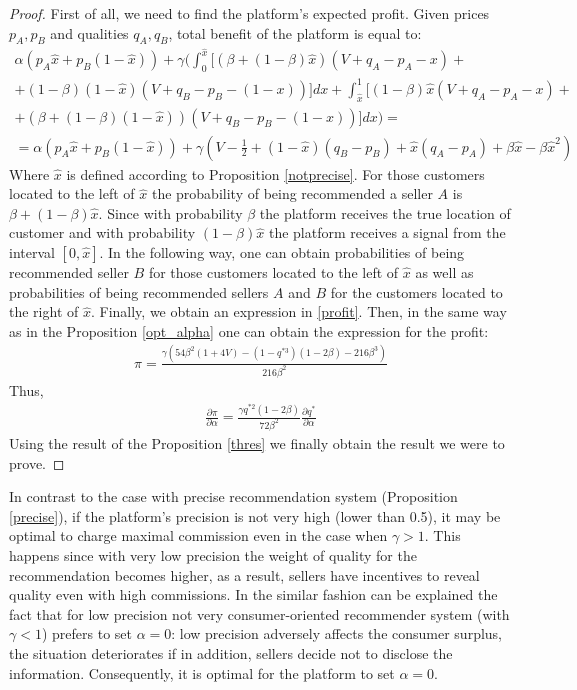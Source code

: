\documentclass[a4paper]{article}
\begin{document}
\begin{proof}
 First of all, we need to find the platform's expected profit. Given prices $p_A, p_B$ and qualities $q_A, q_B$, total benefit of the platform is equal to:
 \begin{align}\label{profit}
 \alpha(p_A \hat{x} + p_B(1-\hat{x})) + \gamma \biggl(\int_{0}^{\hat{x}} \biggl[ (\beta +(1-\beta)\hat{x})(V + q_A - p_A - x) + \nonumber \\+ (1-\beta)(1-\hat{x})(V + q_B - p_B - (1-x))\biggr]dx + \int_{\hat{x}}^1 \biggl[(1-\beta) \hat{x}(V+q_A-p_A-x) + \nonumber\\
 +(\beta + (1-\beta)(1-\hat{x}))(V + q_B - p_B -(1-x)) \biggr] dx\biggr) = \\
 = 	\alpha(p_A \hat{x} + p_B(1-\hat{x})) + \gamma \left(V - \frac{1}{2}+(1-\hat{x})(q_B - p_B) + \hat{x}(q_A-p_A) + \beta \hat{x} - \beta \hat{x}^2  \right)\nonumber
 \end{align}
 Where $\hat{x}$ is defined according to Proposition \ref{notprecise}. For those customers located to the left of $\hat{x}$ the probability of being recommended a seller $A$ is $\beta + (1-\beta) \hat{x}$. Since with probability $\beta$ the platform receives the true location of customer and with probability $(1-\beta) \hat{x}$ the platform receives a signal from the interval $[0, \hat{x}]$. In the following way, one can obtain probabilities of being recommended seller $B$ for those customers located to the left of $\hat{x}$ as well as probabilities of being recommended sellers $A$ and $B$ for the customers located to the right of $\hat{x}$. Finally, we obtain an expression in \eqref{profit}. Then, in the same way as in the Proposition \ref{opt_alpha} one can obtain the expression for the profit:
 \begin{align}\label{profit_b}
 \pi = \frac{\gamma(54 \beta^2(1+4V) - (1-q^{*3})(1-2\beta) - 216 \beta^3)}{216 \beta^2}
 \end{align}
 Thus, \begin{align*}
 \frac{\partial \pi }{\partial \alpha} = \frac{\gamma q^{*2}(1-2\beta)}{72 \beta^2} \frac{\partial q^*}{\partial \alpha}
 \end{align*}
 Using the result of the Proposition \ref{thres} we finally obtain the result we were to prove.
\end{proof}
In contrast to the case with precise recommendation system (Proposition \ref{precise}), if the platform's precision is not very high (lower than 0.5), it may be optimal to charge maximal commission even in the case when $\gamma > 1$. This happens since with very low precision the weight of quality for the recommendation becomes higher, as a result, sellers have incentives to reveal quality even with high commissions. In the similar fashion can be explained the fact that for low precision not very consumer-oriented recommender system (with $\gamma < 1$) prefers to set $\alpha = 0$: low precision adversely affects the consumer surplus, the situation deteriorates if in addition, sellers decide not to disclose the information. Consequently, it is optimal for the platform to set $\alpha = 0$.
\end{document}
